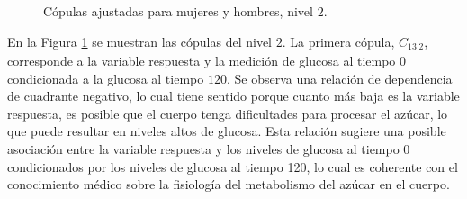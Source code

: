 \begin{figure}[H]
 \centering
    \caption{Cópulas ajustadas para mujeres y hombres, nivel $2$.}
    \label{fig:Modelo4TotalNivel2}
\end{figure}

En la Figura \ref{fig:Modelo4TotalNivel2} se muestran las cópulas del nivel $2$. La primera cópula, $C_{13|2}$, corresponde a la variable respuesta y la medición de glucosa al tiempo $0$ condicionada a la glucosa al tiempo $120$. Se observa una relación de dependencia de cuadrante negativo, lo cual tiene sentido porque cuanto más baja es la variable respuesta, es posible que el cuerpo tenga dificultades para procesar el azúcar, lo que puede resultar en niveles altos de glucosa. Esta relación sugiere una posible asociación entre la variable respuesta y los niveles de glucosa al tiempo $0$ condicionados por los niveles de glucosa al tiempo 120, lo cual es coherente con el conocimiento médico sobre la fisiología del metabolismo del azúcar en el cuerpo.

